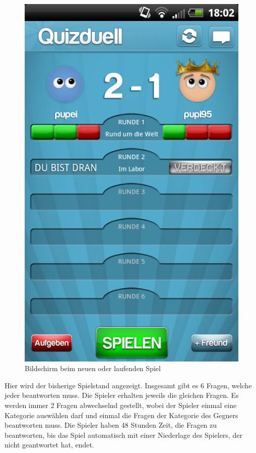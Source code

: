 \documentclass[fontsize=12pt,paper=a4,twoside]{scrartcl}
\begin{document}
\begin{figure}[H]
\centering
\includegraphics[scale=0.5]{Bilder/spiel.png}
\caption{Bildschirm beim neuen oder laufenden Spiel}
\end{figure}

Hier wird der bisherige Spielstand angezeigt. Insgesamt gibt es 6 Fragen, welche jeder beantworten muss. Die Spieler erhalten jeweils die gleichen Fragen. Es werden immer 2 Fragen abwechselnd gestellt, wobei der Spieler einmal eine Kategorie auswählen darf und einmal die Fragen der Kategorie des Gegners beantworten muss. Die Spieler haben 48 Stunden Zeit, die Fragen zu beantworten, bis das Spiel automatisch mit einer Niederlage des Spielers, der nicht geantwortet hat, endet. 
\end{document}
